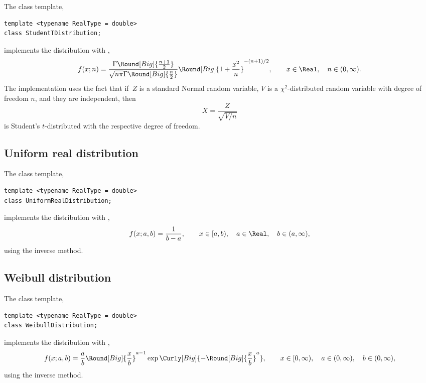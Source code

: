 The class template,
\begin{verbatim}
template <typename RealType = double>
class StudentTDistribution;
\end{verbatim}
implements the distribution with \pdf,
\begin{equation*}
  f(x;n) =
  \frac{\Gamma\Round[Big]{\frac{n + 1}{2}}}
  {\sqrt{n\pi}\Gamma\Round[Big]{\frac{n}{2}}}
  \Round[Big]{1 + \frac{x^2}{n}}^{-(n + 1)/2},\qquad
  x \in \Real,\quad n \in (0, \infty).
\end{equation*}
The implementation uses the fact that if~$Z$ is a standard Normal random
variable, $V$ is a $\chi^2$-distributed random variable with degree of freedom
$n$, and they are independent, then
\begin{equation*}
  X = \frac{Z}{\sqrt{V / n}}
\end{equation*}
is Student's $t$-distributed with the respective degree of freedom.

\subsection{Uniform real distribution}
\label{sub:Uniform real distribution}

The class template,
\begin{verbatim}
template <typename RealType = double>
class UniformRealDistribution;
\end{verbatim}
implements the distribution with \pdf,
\begin{equation*}
  f(x;a,b) = \frac{1}{b - a},\qquad
  x \in [a, b),\quad a \in \Real,\quad b \in (a, \infty),
\end{equation*}
using the inverse method.

\subsection{Weibull distribution}
\label{sub:Weibull distribution}

The class template,
\begin{verbatim}
template <typename RealType = double>
class WeibullDistribution;
\end{verbatim}
implements the distribution with \pdf,
\begin{equation*}
  f(x;a,b) = \frac{a}{b}\Round[Big]{\frac{x}{b}}^{a - 1}
  \exp\Curly[Big]{-\Round[Big]{\frac{x}{b}}^a},\qquad
  x \in [0, \infty),\quad a \in (0, \infty),\quad b \in (0, \infty),
\end{equation*}
using the inverse method.

